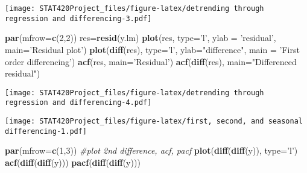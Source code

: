 \documentclass[]{article}
\newenvironment{Shaded}{\begin{snugshade}}{\end{snugshade}}
\newcommand{\CommentTok}[1]{\textcolor[rgb]{0.56,0.35,0.01}{\textit{#1}}}
\newcommand{\DataTypeTok}[1]{\textcolor[rgb]{0.13,0.29,0.53}{#1}}
\newcommand{\DecValTok}[1]{\textcolor[rgb]{0.00,0.00,0.81}{#1}}
\newcommand{\KeywordTok}[1]{\textcolor[rgb]{0.13,0.29,0.53}{\textbf{#1}}}
\newcommand{\NormalTok}[1]{#1}
\newcommand{\StringTok}[1]{\textcolor[rgb]{0.31,0.60,0.02}{#1}}
\begin{document}
\texttt{[image: STAT420Project\_files/figure-latex/detrending through regression and differencing-3.pdf]}

\begin{Shaded}
\begin{Highlighting}[]
\KeywordTok{par}\NormalTok{(}\DataTypeTok{mfrow=}\KeywordTok{c}\NormalTok{(}\DecValTok{2}\NormalTok{,}\DecValTok{2}\NormalTok{))}
\NormalTok{res=}\KeywordTok{resid}\NormalTok{(y.lm)}
\KeywordTok{plot}\NormalTok{(res, }\DataTypeTok{type=}\StringTok{'l'}\NormalTok{, }\DataTypeTok{ylab =} \StringTok{'residual'}\NormalTok{, }\DataTypeTok{main=}\StringTok{'Residual plot'}\NormalTok{)}
\KeywordTok{plot}\NormalTok{(}\KeywordTok{diff}\NormalTok{(res), }\DataTypeTok{type=}\StringTok{'l'}\NormalTok{, }\DataTypeTok{ylab=}\StringTok{"difference"}\NormalTok{, }\DataTypeTok{main =} \StringTok{'First order differencing'}\NormalTok{)}
\KeywordTok{acf}\NormalTok{(res, }\DataTypeTok{main=}\StringTok{'Residual'}\NormalTok{)}
\KeywordTok{acf}\NormalTok{(}\KeywordTok{diff}\NormalTok{(res), }\DataTypeTok{main=}\StringTok{"Differenced residual"}\NormalTok{)}
\end{Highlighting}
\end{Shaded}

\texttt{[image: STAT420Project\_files/figure-latex/detrending through regression and differencing-4.pdf]}

\begin{Shaded}
\end{Shaded}

\texttt{[image: STAT420Project\_files/figure-latex/first, second, and seasonal differencing-1.pdf]}

\begin{Shaded}
\begin{Highlighting}[]
\KeywordTok{par}\NormalTok{(}\DataTypeTok{mfrow=}\KeywordTok{c}\NormalTok{(}\DecValTok{1}\NormalTok{,}\DecValTok{3}\NormalTok{))}
\CommentTok{#plot 2nd difference, acf, pacf}
\KeywordTok{plot}\NormalTok{(}\KeywordTok{diff}\NormalTok{(}\KeywordTok{diff}\NormalTok{(y)), }\DataTypeTok{type=}\StringTok{'l'}\NormalTok{)}
\KeywordTok{acf}\NormalTok{(}\KeywordTok{diff}\NormalTok{(}\KeywordTok{diff}\NormalTok{(y)))}
\KeywordTok{pacf}\NormalTok{(}\KeywordTok{diff}\NormalTok{(}\KeywordTok{diff}\NormalTok{(y)))}
\end{Highlighting}
\end{Shaded}
\end{document}
